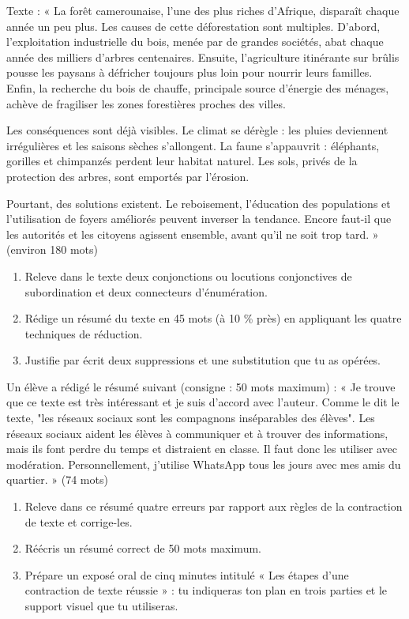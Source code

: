 \documentclass[11pt]{article}
\begin{document}
\begin{exercice}
Texte : « La forêt camerounaise, l'une des plus riches d'Afrique, disparaît chaque année un peu plus. Les causes de cette déforestation sont multiples. D'abord, l'exploitation industrielle du bois, menée par de grandes sociétés, abat chaque année des milliers d'arbres centenaires. Ensuite, l'agriculture itinérante sur brûlis pousse les paysans à défricher toujours plus loin pour nourrir leurs familles. Enfin, la recherche du bois de chauffe, principale source d'énergie des ménages, achève de fragiliser les zones forestières proches des villes.

Les conséquences sont déjà visibles. Le climat se dérègle : les pluies deviennent irrégulières et les saisons sèches s'allongent. La faune s'appauvrit : éléphants, gorilles et chimpanzés perdent leur habitat naturel. Les sols, privés de la protection des arbres, sont emportés par l'érosion.

Pourtant, des solutions existent. Le reboisement, l'éducation des populations et l'utilisation de foyers améliorés peuvent inverser la tendance. Encore faut-il que les autorités et les citoyens agissent ensemble, avant qu'il ne soit trop tard. » (environ 180 mots)
\begin{enumerate}
\item Releve dans le texte deux conjonctions ou locutions conjonctives de subordination et deux connecteurs d'énumération.
\item Rédige un résumé du texte en 45 mots (à 10 \% près) en appliquant les quatre techniques de réduction.
\item Justifie par écrit deux suppressions et une substitution que tu as opérées.
\end{enumerate}
\end{exercice}

\begin{exercice}
Un élève a rédigé le résumé suivant (consigne : 50 mots maximum) : « Je trouve que ce texte est très intéressant et je suis d'accord avec l'auteur. Comme le dit le texte, "les réseaux sociaux sont les compagnons inséparables des élèves". Les réseaux sociaux aident les élèves à communiquer et à trouver des informations, mais ils font perdre du temps et distraient en classe. Il faut donc les utiliser avec modération. Personnellement, j'utilise WhatsApp tous les jours avec mes amis du quartier. » (74 mots)
\begin{enumerate}
\item Releve dans ce résumé quatre erreurs par rapport aux règles de la contraction de texte et corrige-les.
\item Réécris un résumé correct de 50 mots maximum.
\item Prépare un exposé oral de cinq minutes intitulé « Les étapes d'une contraction de texte réussie » : tu indiqueras ton plan en trois parties et le support visuel que tu utiliseras.
\end{enumerate}
\end{exercice}
\end{document}
